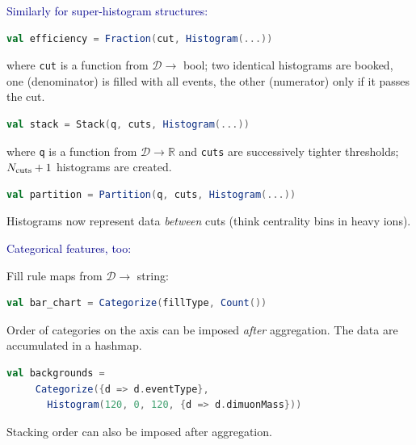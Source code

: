 \documentclass{beamer}
\begin{document}
\begin{frame}[fragile]{}
\textcolor{darkblue}{\large Similarly for super-histogram structures:}

\vspace{0.5 cm}
\begin{lstlisting}[language=scala]
val efficiency = Fraction(cut, Histogram(...))
\end{lstlisting}
where {\tt \small cut} is a function from $\mathcal{D} \to$ bool; two identical histograms are booked, one (denominator) is filled with all events, the other (numerator) only if it passes the cut.

\vfill
\begin{lstlisting}[language=scala]
val stack = Stack(q, cuts, Histogram(...))
\end{lstlisting}
where {\tt \small q} is a function from $\mathcal{D} \to \mathbb{R}$ and {\tt \small cuts} are successively tighter thresholds; $N_{\mbox{\scriptsize cuts}} + 1$ histograms are created.

\vfill
\begin{lstlisting}[language=scala]
val partition = Partition(q, cuts, Histogram(...))
\end{lstlisting}
Histograms now represent data {\it between} cuts (think centrality bins in heavy ions).
\end{frame}

\begin{frame}[fragile]{}
\textcolor{darkblue}{\large Categorical features, too:}

\vfill
Fill rule maps from $\mathcal{D} \to$ string:
\begin{lstlisting}[language=scala]
val bar_chart = Categorize(fillType, Count())
\end{lstlisting}
Order of categories on the axis can be imposed {\it after} aggregation. The data are accumulated in a hashmap.

\vfill
\begin{lstlisting}[language=scala]
val backgrounds =
     Categorize({d => d.eventType},
       Histogram(120, 0, 120, {d => d.dimuonMass}))
\end{lstlisting}

Stacking order can also be imposed after aggregation.
\end{frame}
\end{document}
